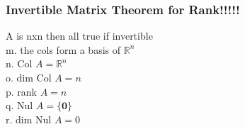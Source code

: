 \documentclass[12pt]{article}
\newcommand{\R}{\mathbb{R}}
\begin{document}
    \subsubsection{Invertible Matrix Theorem for Rank!!!!!}
        A is nxn then all true if invertible \\
        m. the cols form a basis of $\R^n$ \\
        n. Col $A = \R^n$  \\
        o. dim Col $A = n$  \\
        p. rank $A = n$  \\
        q. Nul $A = \{\bm{0}\}$ \\
        r. dim Nul $A = 0$ 
\end{document}

